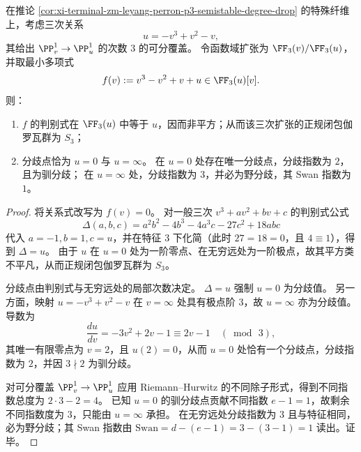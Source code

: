 
\begin{theorem}\label{thm:xi-terminal-zm-leyang-perron-p3-cubic-discriminant-s3-swan}
在推论 \ref{cor:xi-terminal-zm-leyang-perron-p3-semistable-degree-drop} 的特殊纤维上，考虑三次关系
\[
u=-v^3+v^2-v,
\]
其给出 \(\PP^1_v\to\PP^1_u\) 的次数 \(3\) 的可分覆盖。
令函数域扩张为 \(\FF_3(v)/\FF_3(u)\)，并取最小多项式
\[
f(v):=v^3-v^2+v+u\in \FF_3(u)[v].
\]
则：
\begin{enumerate}
  \item \(f\) 的判别式在 \(\FF_3(u)\) 中等于 \(u\)，因而非平方；从而该三次扩张的正规闭包伽罗瓦群为 \(S_3\)；
  \item 分歧点恰为 \(u=0\) 与 \(u=\infty\)。
        在 \(u=0\) 处存在唯一分歧点，分歧指数为 \(2\)，且为驯分歧；
        在 \(u=\infty\) 处，分歧指数为 \(3\)，并必为野分歧，其 Swan 指数为 \(1\)。
\end{enumerate}
\end{theorem}
\begin{proof}
将关系式改写为 \(f(v)=0\)。
对一般三次 \(v^3+av^2+bv+c\) 的判别式公式
\[
\Delta(a,b,c)=a^2b^2-4b^3-4a^3c-27c^2+18abc
\]
代入 \(a=-1,b=1,c=u\)，并在特征 \(3\) 下化简（此时 \(27=18=0\)，且 \(4\equiv 1\)），得到
\(
\Delta=u
\)。
由于 \(u\) 在 \(u=0\) 处为一阶零点、在无穷远处为一阶极点，故其平方类不平凡，从而正规闭包伽罗瓦群为 \(S_3\)。
\par
分歧点由判别式与无穷远处的局部次数决定。
\(\Delta=u\) 强制 \(u=0\) 为分歧值。
另一方面，映射 \(u=-v^3+v^2-v\) 在 \(v=\infty\) 处具有极点阶 \(3\)，故 \(u=\infty\) 亦为分歧值。
导数为
\[
\frac{du}{dv}=-3v^2+2v-1\equiv 2v-1\quad(\bmod\,3),
\]
其唯一有限零点为 \(v=2\)，且 \(u(2)=0\)，从而 \(u=0\) 处恰有一个分歧点，分歧指数为 \(2\)，并因 \(3\nmid 2\) 为驯分歧。
\par
对可分覆盖 \(\PP^1_v\to\PP^1_u\) 应用 Riemann--Hurwitz 的不同除子形式，得到不同指数总度为 \(2\cdot 3-2=4\)。
已知 \(u=0\) 的驯分歧点贡献不同指数 \(e-1=1\)，故剩余不同指数度为 \(3\)，只能由 \(u=\infty\) 承担。
在无穷远处分歧指数为 \(3\) 且与特征相同，必为野分歧；其 Swan 指数由
\(
\mathrm{Swan}=d-(e-1)=3-(3-1)=1
\)
读出。证毕。
\end{proof}

